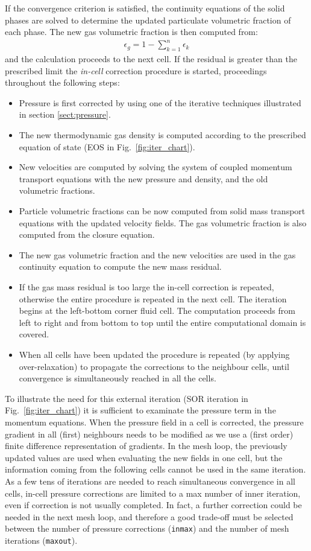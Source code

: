 If the convergence criterion is satisfied, the continuity equations of the solid phases are 
solved to determine the updated particulate volumetric fraction of each phase.
The new gas volumetric fraction is then computed from:
%
\begin{eqnarray}
\epsilon_g  = 1 - \sum_{k=1}^{n} \epsilon_{k}
\nonumber
\end{eqnarray}
%
and the calculation proceeds to the next cell.
If the residual is greater than the prescribed limit the {\em in-cell} correction procedure
is started, proceedings throughout the following steps:
\begin{itemize}
\item Pressure is first corrected by using one of the iterative techniques illustrated in section 
\ref{sect:pressure}. 
\item The new thermodynamic gas density is computed according to the prescribed
equation of state (EOS in Fig.~\ref{fig:iter_chart}). 
\item New velocities are computed by solving the system of coupled momentum transport 
equations with the new pressure and density, and the old volumetric fractions. 
\item Particle volumetric fractions can be now computed from solid mass transport 
equations with the updated velocity fields. The gas volumetric fraction is also computed 
from the closure equation.
\item The new gas volumetric fraction and the new velocities are used in the gas 
continuity  equation to compute the new mass residual.
\item If the gas mass residual is too large the in-cell correction is repeated, otherwise
the entire procedure is repeated in the next cell.
The iteration begins at the left-bottom corner fluid cell. The computation proceeds 
from left to right and from bottom to top until the entire computational domain is covered.
\item When all cells have been updated the procedure is repeated (by applying over-relaxation)
to propagate the corrections to the neighbour cells, until convergence is simultaneously reached
in all the cells. 
\end{itemize}
To illustrate the need for this external iteration (SOR iteration in Fig.~\ref{fig:iter_chart})
it is sufficient to examinate the pressure term in the momentum equations. 
When the pressure field in a cell is corrected, the pressure gradient in all
(first) neighbours needs to be modified as we use a (first order) finite difference representation
of gradients. In the mesh loop, the previously updated values are used when evaluating
the new fields in one cell, but the information coming from the following cells cannot be used 
in the same iteration. 
As a few tens of iterations are needed to reach simultaneous convergence
in all cells, in-cell pressure corrections are limited to a max number of inner iteration,
even if correction is not usually completed. In fact, a further correction could be needed in the next 
mesh loop, and therefore a good trade-off must be selected between the number of pressure corrections
({\tt inmax}) and the number of mesh iterations ({\tt maxout}).\\
%

